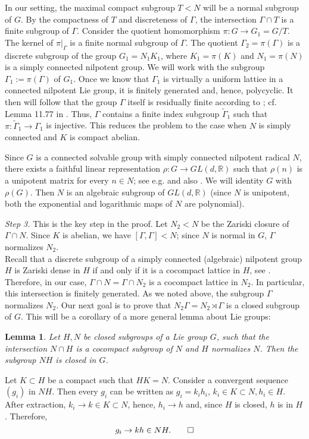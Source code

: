 \documentclass[12pt]{article}
\theoremstyle{boldplain}
\newtheorem{lemma}[equation]{Lemma}
\theoremstyle{bolddefinition}
\numberwithin{equation}{section}
\def\R{{\mathbb R}}
\def\Ga{\Gamma}
\begin{document}
 \medskip
 In our setting, the maximal compact subgroup $T< N$ will be a normal subgroup of $G$. 
 By the compactness of $T$ and discreteness of $\Ga$, the intersection $\Gamma \cap T$ is a finite subgroup of $\Gamma$. Consider the quotient homomorphism $\pi : G \rightarrow G_1=G/T$. The kernel of $\pi|_\Gamma$ is a finite normal subgroup of $\Gamma$. The quotient $\Gamma_2=\pi(\Gamma)$ is a discrete subgroup of the group $G_1= N_1 K_1$, where $K_1= \pi(K)$ and $N_1=\pi(N)$ is a simply connected nilpotent group. We will work with the subgroup $\Ga_1:=\pi(\Gamma)$ of $G_1$. Once we know that $\Gamma_1$ is virtually a uniform lattice in a connected nilpotent Lie group, it is finitely generated and, hence, polycyclic. It then will follow that  the  group $\Gamma$ itself is  residually finite according to \cite{Hirsch}; cf. Lemma 11.77 in \cite{Drutu-Kapovich}. Thus, $\Gamma$ contains a finite index subgroup $\tilde\Gamma_1$ such that $\pi: \tilde\Gamma_1\to \Gamma_1$ is injective. This reduces the problem to the case when $N$ is simply connected and $K$ is compact abelian. 
 
Since $G$ is a connected solvable group with simply connected  nilpotent radical $N$,  there exists a faithful linear representation $\rho: G \rightarrow  GL(d,\R) $ such that $\rho(n)$ is a unipotent matrix for every $n \in N$; see e.g. \cite{Ho} and also \cite{S1}. 
We will identity $G$ with $\rho(G)$. Then $N$ is an algebraic subgroup of $GL(d, \R)$ (since $N$ is unipotent, both the exponential and logarithmic maps of $N$ are polynomial). 
 
 \medskip 
 {\textit{Step 3.}} This is the key step in the proof. Let $N_2 < N$ be the Zariski closure of $\Gamma \cap N$. Since $K$ is abelian, we have  
 $[\Gamma, \Gamma] < N$; since $N$ is normal in $G$,  $\Gamma$ normalizes 
 $N_2$.\\
 
 Recall that a discrete subgroup of a simply connected (algebraic) nilpotent group $H$ is Zariski dense in 
 $H$  if and only if it is a cocompact lattice in $H$, see \cite[Theorem 2.3, page 30]{R}.  
 Therefore, in our case,  $\Gamma \cap N= \Gamma \cap N_2$  is a cocompact lattice in $N_2$. In particular, this intersection is finitely generated. 
As we noted above, the subgroup $\Ga$ normalizes $N_2$.  Our next goal is to prove that $N_2\Ga= N_2\rtimes \Ga$ is a closed subgroup of $G$.  This will be a corollary of a more general lemma about Lie groups:

\begin{lemma}
Let $H, N$ be closed subgroups of a Lie group $G$, such that 
the intersection $N\cap H$ is a cocompact subgroup of $N$ and $H$ normalizes $N$. 
Then the subgroup $NH$ is closed in $G$. 
\end{lemma}
 \proof Let $K\subset H$ be a compact such that $HK=N$. Consider a convergent sequence $(g_i)$ 
 in $NH$. Then every $g_i$ can be written as $g_i= k_i h_i$, $k_i\in K\subset N, h_i\in H$.  After extraction, $k_i\to k\in K\subset N$, hence, $h_i\to h$ and, since $H$ is closed, $h$ is in $H$. Therefore, 
 $$
 g_i\to kh\in NH. \qed 
 $$
 
\end{document}
